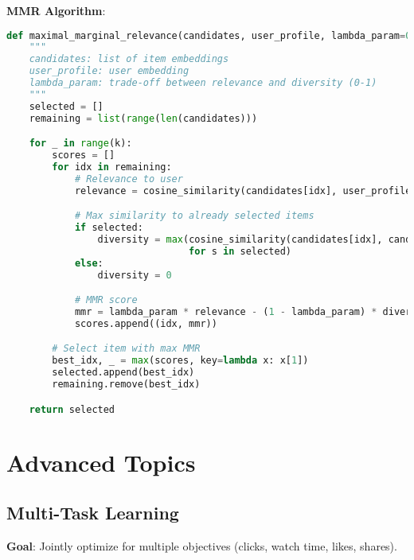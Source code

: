 \documentclass[10pt]{article}
\begin{document}
\textbf{MMR Algorithm}:
\begin{lstlisting}[language=Python]
def maximal_marginal_relevance(candidates, user_profile, lambda_param=0.5, k=10):
    """
    candidates: list of item embeddings
    user_profile: user embedding
    lambda_param: trade-off between relevance and diversity (0-1)
    """
    selected = []
    remaining = list(range(len(candidates)))

    for _ in range(k):
        scores = []
        for idx in remaining:
            # Relevance to user
            relevance = cosine_similarity(candidates[idx], user_profile)

            # Max similarity to already selected items
            if selected:
                diversity = max(cosine_similarity(candidates[idx], candidates[s])
                                for s in selected)
            else:
                diversity = 0

            # MMR score
            mmr = lambda_param * relevance - (1 - lambda_param) * diversity
            scores.append((idx, mmr))

        # Select item with max MMR
        best_idx, _ = max(scores, key=lambda x: x[1])
        selected.append(best_idx)
        remaining.remove(best_idx)

    return selected
\end{lstlisting}

\section{Advanced Topics}

\subsection{Multi-Task Learning}

\textbf{Goal}: Jointly optimize for multiple objectives (clicks, watch time, likes, shares).
\end{document}
